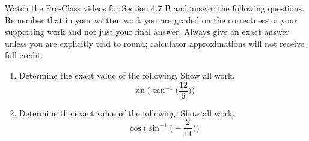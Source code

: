 


\noindent Watch the Pre-Class videos for Section 4.7 B and answer the following questions. Remember that in your written work you are graded on the correctness of your supporting work and not just your final answer. Always give an exact answer unless you are explicitly told to round; calculator approximations will not receive full credit. 


\begin{enumerate}


\item  Determine the exact value of the following.  Show all work.
$$\sin\Big(\tan^{-1}\Big(\frac{12}{5}\Big)\Big)$$
\vfill
\item Determine the exact value of the following.  Show all work.
$$\cos\Big(\sin^{-1}\Big(-\frac{2}{11}\Big)\Big)$$
\vfill
\end{enumerate}



